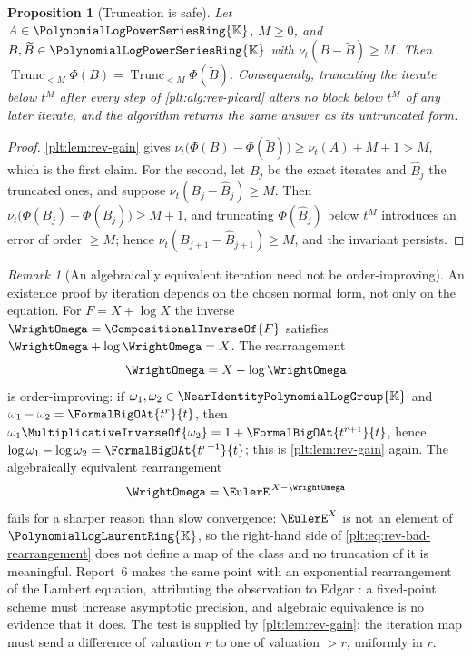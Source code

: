 \documentclass[11pt,oneside]{article}
\theoremstyle{plain}
\newtheorem{proposition}[theorem]{Proposition}
\theoremstyle{definition}
\theoremstyle{remark}
\newtheorem{remark}[theorem]{Remark}
\newcommand{\K}{\mathbb{K}}
\newcommand{\PLpow}{\PolynomialLogPowerSeriesRing{\K}}   %
\newcommand{\PLlau}{\PolynomialLogLaurentRing{\K}}       %
\newcommand{\Gnear}{\NearIdentityPolynomialLogGroup{\K}} %
\newcommand{\ordt}{\nu_{t}}                              %
\newcommand{\Trunc}[2]{\operatorname{Trunc}_{<#2}#1}     %
\newcommand{\rev}[1]{\CompositionalInverseOf{#1}}
\begin{document}
\begin{proposition}[Truncation is safe]
\label{plt:prop:rev-truncation-safe}
Let \(A\in\PLpow\), \(M\ge0\), and \(B,\widetilde B\in\PLpow\) with
\(\ordt(B-\widetilde B)\ge M\).  Then
\(\Trunc{\Phi(B)}{M}=\Trunc{\Phi(\widetilde B)}{M}\).  Consequently, truncating
the iterate below \(t^{M}\) after every step of \cref{plt:alg:rev-picard}
alters no block below \(t^{M}\) of any later iterate, and the algorithm returns
the same answer as its untruncated form.
\end{proposition}

\begin{proof}
\cref{plt:lem:rev-gain} gives
\(\ordt\bigl(\Phi(B)-\Phi(\widetilde B)\bigr)\ge\ordt(A)+M+1>M\), which is the
first claim.  For the second, let \(B_j\) be the exact iterates and
\(\widehat B_j\) the truncated ones, and suppose
\(\ordt(B_j-\widehat B_j)\ge M\).  Then
\(\ordt\bigl(\Phi(B_j)-\Phi(\widehat B_j)\bigr)\ge M+1\), and truncating
\(\Phi(\widehat B_j)\) below \(t^M\) introduces an error of order \(\ge M\);
hence \(\ordt(B_{j+1}-\widehat B_{j+1})\ge M\), and the invariant persists.
\end{proof}

\begin{remark}[An algebraically equivalent iteration need not be
order-improving]
\label{plt:rmk:rev-bad-rearrangement}
An existence proof by iteration depends on the chosen normal form, not only on
the equation.  For \(F=X+\log X\) the inverse \(\WrightOmega=\rev{F}\)
satisfies \(\WrightOmega+\log\WrightOmega=X\).  The rearrangement
\begin{equation}\label{plt:eq:rev-good-rearrangement}
 \WrightOmega=X-\log\WrightOmega
\end{equation}
is order-improving: if \(\omega_1,\omega_2\in\Gnear\) and
\(\omega_1-\omega_2=\FormalBigOAt{t^{r}}{t}\), then
\(\omega_1\MultiplicativeInverseOf{\omega_2}=1+\FormalBigOAt{t^{r+1}}{t}\),
hence \(\log\omega_1-\log\omega_2=\FormalBigOAt{t^{r+1}}{t}\); this is
\cref{plt:lem:rev-gain} again.  The algebraically equivalent rearrangement
\begin{equation}\label{plt:eq:rev-bad-rearrangement}
 \WrightOmega=\EulerE^{\,X-\WrightOmega}
\end{equation}
fails for a sharper reason than slow convergence: \(\EulerE^{X}\) is not an
element of \(\PLlau\), so the right-hand side of
\eqref{plt:eq:rev-bad-rearrangement} does not define a map of the class and no
truncation of it is meaningful.  Report~6 makes the same point with an
exponential rearrangement of the Lambert equation, attributing the observation
to Edgar \cite{edgar-beginners}: a fixed-point scheme must increase asymptotic
precision, and algebraic equivalence is no evidence that it does.  The test is
supplied by \cref{plt:lem:rev-gain}: the iteration map must send a difference of
valuation \(r\) to one of valuation \(>r\), uniformly in \(r\).
\end{remark}
\end{document}

